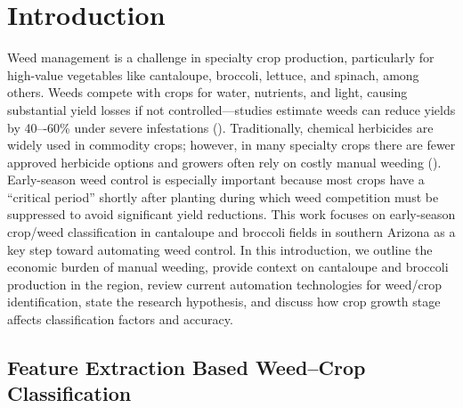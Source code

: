 \documentclass[letterpaper, notitlepage]{report}
\begin{document}

\newpage
{}
\setcounter{page}{12}
%
%

\chapter{Introduction}
Weed management is a challenge in specialty crop production, particularly for high-value vegetables like cantaloupe, broccoli, lettuce, and spinach, among others. Weeds compete with crops for water, nutrients, and light, causing substantial yield losses if not controlled---studies estimate weeds can reduce yields by 40–-60\% under severe infestations (\cite{Garibaldi-Marquez2022-yn}). Traditionally, chemical herbicides are widely used in commodity crops; however, in many specialty crops there are fewer approved herbicide options and growers often rely on costly manual weeding (\cite{American-Society-of-Agronomy2018-ad}). Early-season weed control is especially important because most crops have a “critical period” shortly after planting during which weed competition must be suppressed to avoid significant yield reductions. This work focuses on early-season crop/weed classification in cantaloupe and broccoli fields in southern Arizona as a key step toward automating weed control. In this introduction, we outline the economic burden of manual weeding, provide context on cantaloupe and broccoli production in the region, review current automation technologies for weed/crop identification, state the research hypothesis, and discuss how crop growth stage affects classification factors and accuracy.

\section{Feature Extraction Based Weed–Crop Classification}
\end{document}
